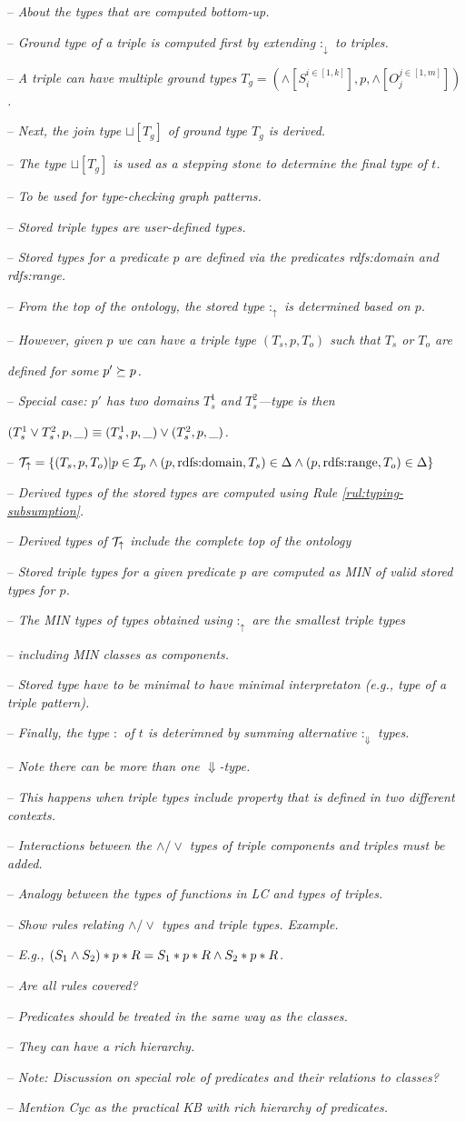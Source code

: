 \documentclass[runningheads]{llncs}
\newcommand{\darr}{\downarrow}
\newcommand{\uarr}{\uparrow}
\newcommand{\Darr}{\Downarrow}
\newcommand{\I}{{\cal I}}
\newcommand{\T}{{\cal T}}
\newcommand{\notes}[1]{\noindent\begin{small}-- \emph{#1}\hfill\break\end{small}}
\newcommand{\nnotes}[1]{\indent\begin{small}-- \emph{#1}\hfill\break\end{small}}
\newcommand{\nnnotes}[1]{\indent\indent\begin{small}-- \emph{#1}\hfill\break\end{small}}
\newcommand{\anotes}[1]{\indent\begin{small}\phantom{-- }\emph{#1}\hfill\break\end{small}}
\begin{document}
\notes{About the types that are computed bottom-up.}
\nnotes{Ground type of a triple is computed first by extending $:_\darr$ to triples.}
\nnotes{A triple can have multiple ground types $T_g=(\land[S_i^{i\in[1,k]}],p,\land[O_j^{j\in[1,m]}])$.}
\nnotes{Next, the join type $\sqcup[T_g]$ of ground type $T_g$ is derived.}
\nnotes{The type $\sqcup[T_g]$ is used as a stepping stone to determine the final type of $t$.}
\nnnotes{To be used for type-checking graph patterns.}

\notes{Stored triple types are user-defined types.}
\nnotes{Stored types for a predicate $p$ are defined via the predicates rdfs:domain and rdfs:range.}
\nnotes{From the top of the ontology, the stored type $:_\uarr$ is determined based on $p$.}
\nnotes{However, given $p$ we can have a triple type $(T_s,p,T_o)$ such that $T_s$ or $T_o$ are}
\anotes{defined for some $p'\succeq\/p$.}
\nnotes{Special case: $p'$ has two domains $T_s^1$ and $T_s^2$---type is then}
\anotes{$(T_s^1\lor\/T_s^2,p,\_)\equiv\/(T_s^1,p,\_)\lor(T_s^2,p,\_)$.}
\nnotes{$\T_\uarr=\{(T_s,p,T_o)| p\in\I_p\land(p,\text{rdfs:domain},T_s)\in\Delta\land(p,\text{rdfs:range},T_o)\in\Delta\}$} 
\nnotes{Derived types of the stored types are computed using Rule \ref{rul:typing-subsumption}.}
\nnotes{Derived types of $\T_\uarr$ include the complete top of the ontology }

\notes{Stored triple types for a given predicate $p$ are computed as MIN of valid stored types for $p$.}
\nnotes{The MIN types of types obtained using $:_\uarr$ are the smallest triple types}
\nnotes{including MIN classes as components.}
\nnotes{Stored type have to be minimal to have minimal interpretaton (e.g., type of a triple pattern).}
\nnotes{Finally, the type $:$ of $t$ is deterimned by summing alternative $:_\Darr$ types.}
\nnotes{Note there can be more than one $\Darr$-type.}
\nnotes{This happens when triple types include property that is defined in two different contexts.}

\notes{Interactions between the $\land/\lor$ types of triple components and triples must be added.}
\nnotes{Analogy between the types of functions in LC and types of triples.}
\nnotes{Show rules relating $\land/\lor$ types and triple types. Example.}
\nnotes{E.g., $(S_1\land\/S_2)*p*R = S_1*p*R\land\/S_2*p*R$.}
\nnotes{Are all rules covered?}

\notes{Predicates should be treated in the same way as the classes.}
\nnotes{They can have a rich hierarchy.}
\nnotes{\emph{Note:} Discussion on special role of predicates and their relations to classes?}
\nnotes{Mention Cyc as the practical KB with rich hierarchy of predicates.}
\end{document}
